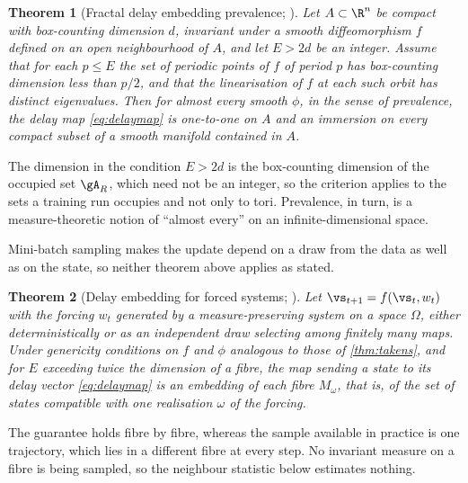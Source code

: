\documentclass[twoside]{article}
\newtheorem{theorem}{Theorem}
\begin{document}
\begin{theorem}[Fractal delay embedding prevalence; \citealp{sauer1991embedology}]\label{thm:sauer}
Let $A \subset \R^{n}$ be compact with box-counting dimension $d$, invariant under a smooth
diffeomorphism $f$ defined on an open neighbourhood of $A$, and let $E > 2d$ be an integer. Assume
that for each $p \le E$ the set of periodic points of $f$ of period $p$ has box-counting dimension
less than $p/2$, and that the linearisation of $f$ at each such orbit has distinct eigenvalues.
Then for almost every smooth $\phi$, in the sense of prevalence, the delay map \cref{eq:delaymap}
is one-to-one on $A$ and an immersion on every compact subset of a smooth manifold contained
in $A$.
\end{theorem}

The dimension in the condition $E > 2d$ is the box-counting dimension of the occupied set $\gA_R$,
which need not be an integer, so the criterion applies to the sets a training run occupies and not
only to tori. Prevalence, in turn, is a measure-theoretic notion of ``almost every'' on an
infinite-dimensional space.

Mini-batch sampling makes the update depend on a draw from the data as well as on the state, so
neither theorem above applies as stated.

\begin{theorem}[Delay embedding for forced systems;
\citealp{stark1999delay, stark2003delay}]\label{thm:stark}
Let $\vs_{t+1} = f(\vs_t, w_t)$ with the forcing $w_t$ generated by a measure-preserving system on a
space $\Omega$, either deterministically or as an independent draw selecting among finitely many
maps. Under genericity conditions on $f$ and $\phi$ analogous to those of \cref{thm:takens}, and
for $E$ exceeding twice the dimension of a fibre, the map sending a state to its delay vector
\cref{eq:delaymap} is an embedding \emph{of each fibre} $M_{\omega}$, that is, of the set of states
compatible with one realisation $\omega$ of the forcing.
\end{theorem}

The guarantee holds fibre by fibre, whereas the sample available in practice is one trajectory,
which lies in a different fibre at every step. No invariant measure on a fibre is being sampled, so
the neighbour statistic below estimates nothing.
\end{document}
